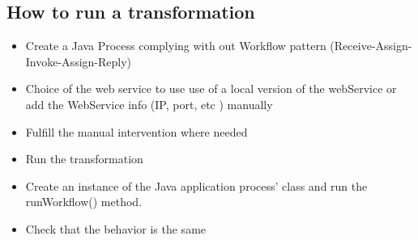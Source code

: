 \subsection{How to run a transformation}
\begin{itemize}
 \item Create a Java Process complying with out Workflow pattern (Receive-Assign-Invoke-Assign-Reply)
 \item Choice of the web service to use 
  \subitem use of a local version of the webService or add the WebService info (IP, port, etc ) manually
 \item Fulfill the manual intervention where needed
 \item Run the transformation
 \item Create an instance of the Java application process' class and run the runWorkflow() method.
 \item Check that the behavior is the same
\end{itemize}
